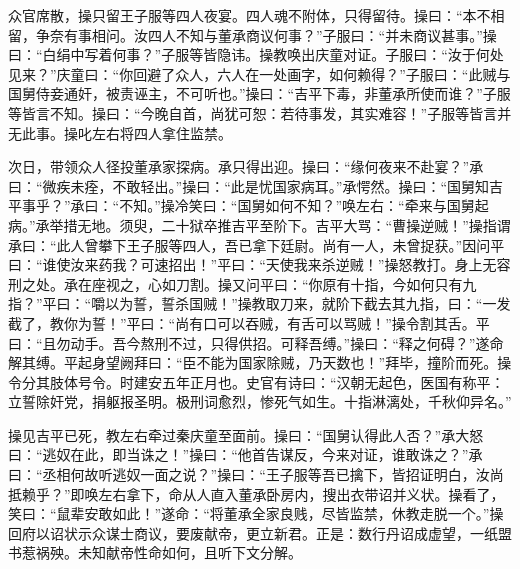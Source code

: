 众官席散，操只留王子服等四人夜宴。四人魂不附体，只得留待。操曰：“本不相留，争奈有事相问。汝四人不知与董承商议何事？”子服曰：“并未商议甚事。”操曰：“白绢中写着何事？”子服等皆隐讳。操教唤出庆童对证。子服曰：“汝于何处见来？”庆童曰：“你回避了众人，六人在一处画字，如何赖得？”子服曰：“此贼与国舅侍妾通奸，被责诬主，不可听也。”操曰：“吉平下毒，非董承所使而谁？”子服等皆言不知。操曰：“今晚自首，尚犹可恕：若待事发，其实难容！”子服等皆言并无此事。操叱左右将四人拿住监禁。

次日，带领众人径投董承家探病。承只得出迎。操曰：“缘何夜来不赴宴？”承曰：“微疾未痊，不敢轻出。”操曰：“此是忧国家病耳。”承愕然。操曰：“国舅知吉平事乎？”承曰：“不知。”操冷笑曰：“国舅如何不知？”唤左右：“牵来与国舅起病。”承举措无地。须臾，二十狱卒推吉平至阶下。吉平大骂：“曹操逆贼！”操指谓承曰：“此人曾攀下王子服等四人，吾已拿下廷尉。尚有一人，未曾捉获。”因问平曰：“谁使汝来药我？可速招出！”平曰：“天使我来杀逆贼！”操怒教打。身上无容刑之处。承在座视之，心如刀割。操又问平曰：“你原有十指，今如何只有九指？”平曰：“嚼以为誓，誓杀国贼！”操教取刀来，就阶下截去其九指，曰：“一发截了，教你为誓！”平曰：“尚有口可以吞贼，有舌可以骂贼！”操令割其舌。平曰：“且勿动手。吾今熬刑不过，只得供招。可释吾缚。”操曰：“释之何碍？”遂命解其缚。平起身望阙拜曰：“臣不能为国家除贼，乃天数也！”拜毕，撞阶而死。操令分其肢体号令。时建安五年正月也。史官有诗曰：“汉朝无起色，医国有称平：立誓除奸党，捐躯报圣明。极刑词愈烈，惨死气如生。十指淋漓处，千秋仰异名。”

操见吉平已死，教左右牵过秦庆童至面前。操曰：“国舅认得此人否？”承大怒曰：“逃奴在此，即当诛之！”操曰：“他首告谋反，今来对证，谁敢诛之？”承曰：“丞相何故听逃奴一面之说？”操曰：“王子服等吾已擒下，皆招证明白，汝尚抵赖乎？”即唤左右拿下，命从人直入董承卧房内，搜出衣带诏并义状。操看了，笑曰：“鼠辈安敢如此！”遂命：“将董承全家良贱，尽皆监禁，休教走脱一个。”操回府以诏状示众谋士商议，要废献帝，更立新君。正是：数行丹诏成虚望，一纸盟书惹祸殃。未知献帝性命如何，且听下文分解。